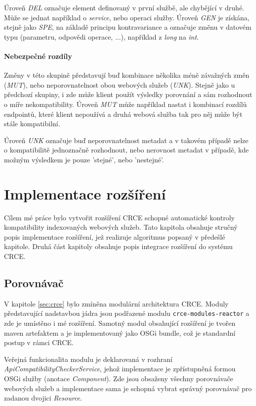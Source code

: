\documentclass[czech,DP]{thesiskiv}
\begin{document}
Úroveň \textit{DEL} označuje element definovaný v první službě, ale chybějící v druhé. Může se jednat například o \textit{service}, nebo operaci služby. Úroveň \textit{GEN} je získána, stejně jako \textit{SPE}, na základě principu kontravariance a označuje změnu v datovém typu (parametru, odpovědi operace, ...), například z \textit{long} na \textit{int}. 

\subsubsection{Nebezpečné rozdíly}

Změny v této skupině představují buď kombinace několika méně závažných změn (\textit{MUT}), nebo neporovnatelnost obou webových služeb (\textit{UNK}). Stejně jako u předchozí skupiny, i zde může klient použít výsledky porovnání a sám rozhodnout o míře nekompatibility. Úroveň \textit{MUT} může například nastat i kombinací rozdílů endpointů, které klient nepoužívá a druhá webová služba tak pro něj může být stále kompatibilní.

Úroveň \textit{UNK} označuje buď neporovnatelnost metadat a v takovém případě nelze o kompatibilitě jednoznačně rozhodnout, nebo nerovnost metadat v případě, kde možným výsledkem je pouze 'stejné', nebo 'nestejné'.


\chapter{Implementace rozšíření}

Cílem mé práce bylo vytvořit rozšíření CRCE schopné automatické kontroly kompatibility indexovaných webových služeb. Tato kapitola obsahuje stručný popis implementace rozšíření, jež realizuje algoritmus popsaný v předešlé kapitole. Druhá část kapitoly obsahuje popis integrace rozšíření do systému CRCE.

\section{Porovnávač}

V kapitole \ref{sec:crce} bylo zmíněna modulární architektura CRCE. Moduly představující nadstavbou jádra jsou podřazené modulu \verb|crce-modules-reactor| a zde je umístěno i mé rozšíření. Samotný modul obsahující rozšíření je tvořen maven artefaktem a je implementovaný jako OSGi bundle, což je standardní postup v rámci CRCE.

Veřejná funkcionalita modulu je deklarovaná v rozhraní \textit{ApiCompatibilityCheckerService}, jehož implementace je zpřístupněná formou OSGi služby (anotace \textit{Component}). Zde jsou obsaženy všechny porovnávače webových služeb a implementace sama je schopná vybrat správný porovnávač pro zadanou dvojici \textit{Resource}.
\end{document}

